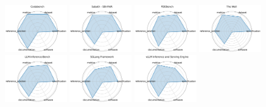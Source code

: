 \documentclass{article}
\begin{document}
\begin{figure}[ht!]
\centering
\includegraphics[width=0.2400\textwidth]{Codabench_radar.pdf}
\includegraphics[width=0.2400\textwidth]{Sabath - SBI-FAIR_radar.pdf}
\includegraphics[width=0.2400\textwidth]{PDEBench_radar.pdf}
\includegraphics[width=0.2400\textwidth]{The Well_radar.pdf}
\\[1ex]
\includegraphics[width=0.2400\textwidth]{LLM-Inference-Bench_radar.pdf}
\includegraphics[width=0.2400\textwidth]{SGLang Framework_radar.pdf}
\includegraphics[width=0.2400\textwidth]{vLLM Inference and Serving Engine_radar.pdf}

\end{figure}
\end{document}
